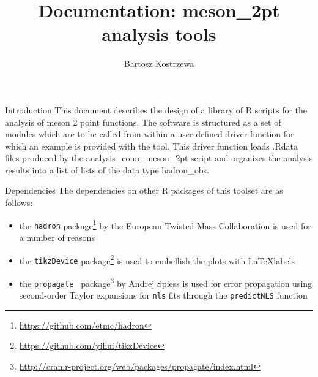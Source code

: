 \documentclass[10pt,a4paper]{article}
\author{Bartosz Kostrzewa}
\title{Documentation: meson\_2pt analysis tools}
\begin{document}
\maketitle

\begin{section}{Introduction}
This document describes the design of a library of R scripts for the analysis of meson 2 point functions. The software is structured as a set of modules which are to be called from within a user-defined driver function for which an example is provided with the tool.
This driver function loads .Rdata files produced by the {\ttfamily analysis\_conn\_meson\_2pt} script and organizes the analysis results into a list of lists of the data type {\ttfamily hadron\_obs}.
\end{section} %

\begin{section}{Dependencies}
 The dependencies on other R packages of this toolset are as follows:
\begin{itemize}
  \item the {\tt hadron} package\footnote{\url{https://github.com/etmc/hadron}} by the European Twisted Mass Collaboration is used for a number of reasons
  \item the {\tt tikzDevice} package\footnote{\url{https://github.com/yihui/tikzDevice}} is used to embellish the plots with \LaTeX labels
  \item the {\tt propagate } package\footnote{\url{http://cran.r-project.org/web/packages/propagate/index.html}} by Andrej Spiess is used for error propagation using second-order Taylor expansions for {\tt nls} fits through the {\tt predictNLS} function
\end{itemize}

\end{section} %
\end{document}
